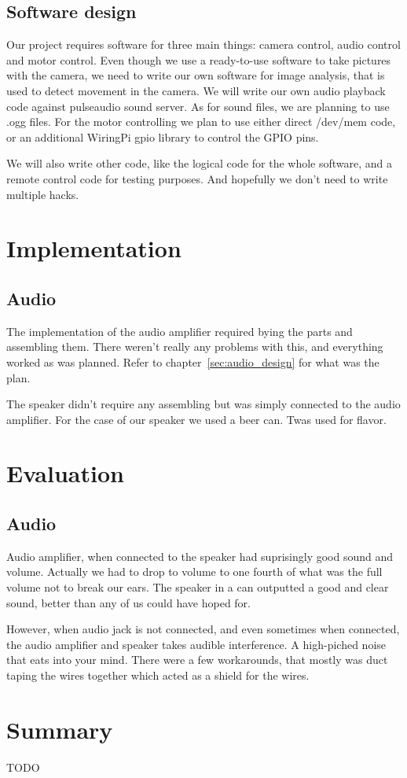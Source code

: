 \documentclass[english,11pt,twoside,a4paper]{article}
\begin{document}
\subsection{Software design}

Our project requires software for three main things: camera control, audio control and motor control. Even though we use a ready-to-use software to take pictures with the camera, we need to write our own software for image analysis, that is used to detect movement in the camera. We will write our own audio playback code against pulseaudio sound server. As for sound files, we are planning to use .ogg files. For the motor controlling we plan to use either direct /dev/mem code, or an additional WiringPi gpio library to control the GPIO pins.

We will also write other code, like the logical code for the whole software, and a remote control code for testing purposes. And hopefully we don't need to write multiple hacks.

\section{Implementation}

\subsection{Audio}

The implementation of the audio amplifier required bying the parts and assembling them. There weren't really any problems with this, and everything worked as was planned. Refer to chapter~\ref{sec:audio_design} for what was the plan.

The speaker didn't require any assembling but was simply connected to the audio amplifier. For the case of our speaker we used a beer can. Twas used for flavor.

\section{Evaluation}

\subsection{Audio}

Audio amplifier, when connected to the speaker had suprisingly good sound and volume. Actually we had to drop to volume to one fourth of what was the full volume not to break our ears. The speaker in a can outputted a good and clear sound, better than any of us could have hoped for.

However, when audio jack is not connected, and even sometimes when connected, the audio amplifier and speaker takes audible interference. A high-piched noise that eats into your mind. There were a few workarounds, that mostly was duct taping the wires together which acted as a shield for the wires.

\section{Summary}

TODO
\end{document}
